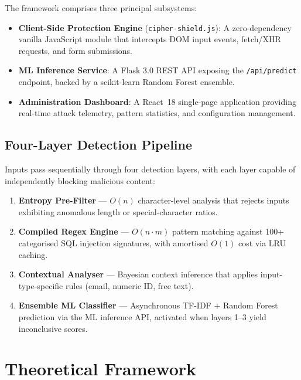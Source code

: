 \documentclass[10pt, twocolumn]{article}
\begin{document}
The framework comprises three principal subsystems:

\begin{itemize}[leftmargin=*, itemsep=1pt, topsep=2pt]
  \item \textbf{Client-Side Protection Engine} (\texttt{cipher-shield.js}): 
        A zero-dependency vanilla JavaScript module that intercepts DOM 
        input events, fetch/XHR requests, and form submissions.
  \item \textbf{ML Inference Service}: A Flask 3.0 REST API exposing the 
        \texttt{/api/predict} endpoint, backed by a scikit-learn 
        Random Forest ensemble.
  \item \textbf{Administration Dashboard}: A React~18 single-page application 
        providing real-time attack telemetry, pattern statistics, and 
        configuration management.
\end{itemize}

\subsection{Four-Layer Detection Pipeline}

Inputs pass sequentially through four detection layers, with each layer 
capable of independently blocking malicious content:

\begin{enumerate}[leftmargin=*, label=\textbf{L\arabic{*}:}, itemsep=2pt, topsep=2pt]
  \item \textbf{Entropy Pre-Filter} --- $O(n)$ character-level analysis 
        that rejects inputs exhibiting anomalous length or special-character 
        ratios.
  \item \textbf{Compiled Regex Engine} --- $O(n \cdot m)$ pattern matching 
        against 100+ categorised SQL injection signatures, with amortised 
        $O(1)$ cost via LRU caching.
  \item \textbf{Contextual Analyser} --- Bayesian context inference that 
        applies input-type-specific rules (email, numeric ID, free text).
  \item \textbf{Ensemble ML Classifier} --- Asynchronous TF-IDF + Random 
        Forest prediction via the ML inference API, activated when layers 
        1--3 yield inconclusive scores.
\end{enumerate}

\section{Theoretical Framework}
\label{sec:theory}
\end{document}
